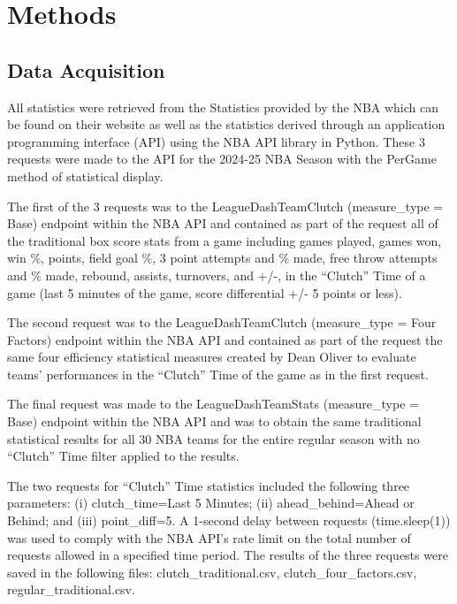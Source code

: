 \section{Methods}

\subsection{Data Acquisition}

\begin{sloppypar}
All statistics were retrieved from the Statistics provided by the NBA which can be found on their website as well as the statistics derived through an application programming interface (API) using the NBA API library in Python. These 3 requests were made to the API for the 2024-25 NBA Season with the PerGame method of statistical display.

The first of the 3 requests was to the LeagueDashTeamClutch (measure\_type = Base) endpoint within the NBA API and contained as part of the request all of the traditional box score stats from a game including games played, games won, win \%, points, field goal \%, 3 point attempts and \% made, free throw attempts and \% made, rebound, assists, turnovers, and +/-, in the ``Clutch'' Time of a game (last 5 minutes of the game, score differential +/- 5 points or less).

The second request was to the LeagueDashTeamClutch (measure\_type = Four Factors) endpoint within the NBA API and contained as part of the request the same four efficiency statistical measures created by Dean Oliver to evaluate teams' performances in the ``Clutch'' Time of the game as in the first request.

The final request was made to the LeagueDashTeamStats (measure\_type = Base) endpoint within the NBA API and was to obtain the same traditional statistical results for all 30 NBA teams for the entire regular season with no ``Clutch'' Time filter applied to the results.

The two requests for ``Clutch'' Time statistics included the following three parameters: (i) clutch\_time=Last 5 Minutes; (ii) ahead\_behind=Ahead or Behind; and (iii) point\_diff=5. A 1-second delay between requests (time.sleep(1)) was used to comply with the NBA API's rate limit on the total number of requests allowed in a specified time period. The results of the three requests were saved in the following files: clutch\_traditional.csv, clutch\_four\_factors.csv, regular\_traditional.csv.
\end{sloppypar}

